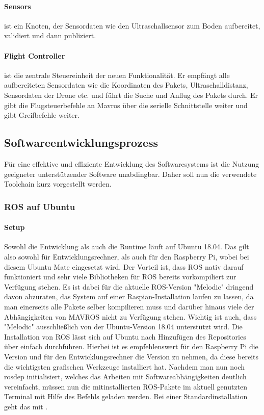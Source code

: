 \paragraph{Sensors} ist ein Knoten, der Sensordaten wie den Ultraschallsensor zum Boden aufbereitet, validiert und dann publiziert.
\paragraph{Flight Controller} ist die zentrale Steuereinheit der neuen Funktionalität. Er empfängt alle aufbereiteten Sensordaten wie die Koordinaten des Pakets, Ultraschalldistanz, Sensordaten der Drone etc. und führt die Suche und Anflug des Pakets durch. Er gibt die Flugsteuerbefehle an Mavros über die serielle Schnittstelle weiter und gibt Greifbefehle weiter.


\subsection{Softwareentwicklungsprozess}
Für eine effektive und effiziente Entwicklung des Softwaresystems ist die Nutzung geeigneter unterstützender Software unabdingbar. Daher soll nun die verwendete Toolchain kurz vorgestellt werden.
\subsubsection{ROS auf Ubuntu}
\paragraph{Setup} Sowohl die Entwicklung als auch die Runtime läuft auf Ubuntu 18.04. Das gilt also sowohl für Entwicklungsrechner, als auch für den Raspberry Pi, wobei bei diesem Ubuntu Mate eingesetzt wird. Der Vorteil ist, dass ROS nativ darauf funktioniert und sehr viele Bibliotheken für ROS bereits vorkompiliert zur Verfügung stehen. Es ist dabei für die aktuelle ROS-Version "Melodic" dringend davon abzuraten, das System auf einer Raspian-Installation laufen zu lassen, da man einerseits alle Pakete selber kompilieren muss und darüber hinaus viele der Abhängigkeiten von MAVROS nicht zu Verfügung stehen. Wichtig ist auch, dass "Melodic" ausschließlich von der Ubuntu-Version 18.04 unterstützt wird. Die Installation von ROS lässt sich auf Ubuntu nach Hinzufügen des Repositories über  einfach durchführen. Hierbei ist es empfehlenswert für den Raspberry Pi die  Version und für den Entwicklungsrechner die  Version zu nehmen, da diese bereits die wichtigsten grafischen Werkzeuge installiert hat. Nachdem man nun noch rosdep initialisiert, welches das Arbeiten mit Softwareabhängigkeiten deutlich vereinfacht, müssen nun die mitinstallierten ROS-Pakete im aktuell genutzten Terminal mit Hilfe des  Befehls geladen werden. Bei einer Standardinstallation geht das mit . 
